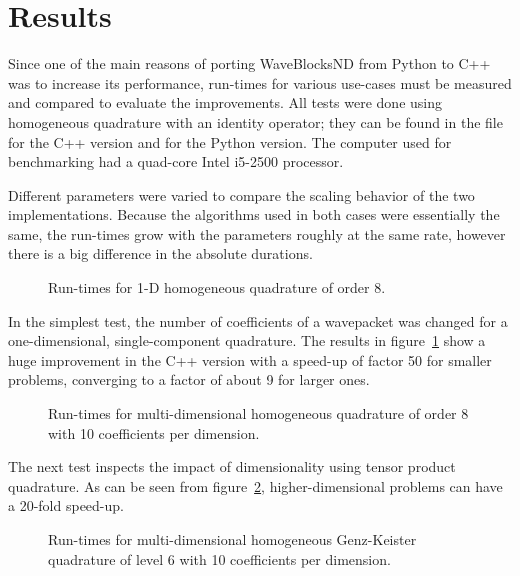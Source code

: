\section{Results}
\label{sec:results}

Since one of the main reasons of porting WaveBlocksND from Python to C++ was to
increase its performance, run-times for various use-cases must be measured and
compared to evaluate the improvements.
All tests were done using homogeneous quadrature with an identity operator;
they can be found in the file  for the
C++ version and  for the Python version.
The computer used for benchmarking had a quad-core Intel i5-2500 processor.

Different parameters were varied to compare the scaling behavior of the two
implementations.
Because the algorithms used in both cases were essentially the same, the
run-times grow with the parameters roughly at the same rate, however there is a
big difference in the absolute durations.

\begin{figure}
  \center
  
  \caption{Run-times for 1-D homogeneous quadrature of order 8.}
  \label{fig:speedup1d}
\end{figure}

In the simplest test, the number of coefficients of a wavepacket was changed
for a one-dimensional, single-component quadrature.
The results in figure~\ref{fig:speedup1d} show a huge improvement in the C++
version with a speed-up of factor 50 for smaller problems, converging to a
factor of about 9 for larger ones.

\begin{figure}
  \center
  
  \caption{Run-times for multi-dimensional homogeneous quadrature of order 8
    with 10 coefficients per dimension.}
  \label{fig:speedupnd}
\end{figure}

The next test inspects the impact of dimensionality using tensor product
quadrature.
As can be seen from figure~\ref{fig:speedupnd}, higher-dimensional problems can
have a 20-fold speed-up.

\begin{figure}
  \center
  
  \caption{Run-times for multi-dimensional homogeneous Genz-Keister quadrature
    of level 6 with 10 coefficients per dimension.}
  \label{fig:speedupgenzkeister}
\end{figure}


